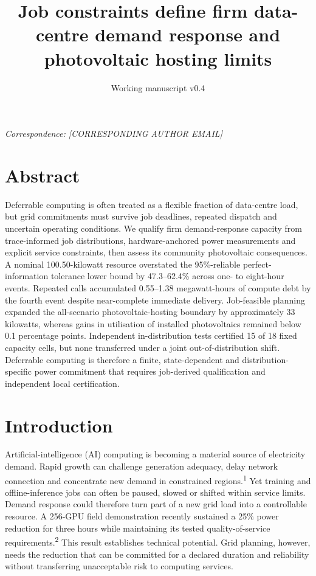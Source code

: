 \documentclass[10pt,a4paper]{article}
\title{\sffamily\bfseries Job constraints define firm data-centre demand response and photovoltaic hosting limits}
\author{\sffamily [AUTHOR NAMES AND AFFILIATIONS]}
\date{Working manuscript v0.4}
\begin{document}
\maketitle
\thispagestyle{fancy}

\emph{Correspondence: [CORRESPONDING AUTHOR EMAIL]}


\section*{Abstract}

Deferrable computing is often treated as a flexible fraction of data-centre load, but grid commitments must survive job deadlines, repeated dispatch and uncertain operating conditions. We qualify firm demand-response capacity from trace-informed job distributions, hardware-anchored power measurements and explicit service constraints, then assess its community photovoltaic consequences. A nominal 100.50-kilowatt resource overstated the 95\%-reliable perfect-information tolerance lower bound by 47.3–62.4\% across one- to eight-hour events. Repeated calls accumulated 0.55–1.38 megawatt-hours of compute debt by the fourth event despite near-complete immediate delivery. Job-feasible planning expanded the all-scenario photovoltaic-hosting boundary by approximately 33 kilowatts, whereas gains in utilisation of installed photovoltaics remained below 0.1 percentage points. Independent in-distribution tests certified 15 of 18 fixed capacity cells, but none transferred under a joint out-of-distribution shift. Deferrable computing is therefore a finite, state-dependent and distribution-specific power commitment that requires job-derived qualification and independent local certification.


\section*{Introduction}

Artificial-intelligence (AI) computing is becoming a material source of electricity demand. Rapid growth can challenge generation adequacy, delay network connection and concentrate new demand in constrained regions.\textsuperscript{1} Yet training and offline-inference jobs can often be paused, slowed or shifted within service limits. Demand response could therefore turn part of a new grid load into a controllable resource. A 256-GPU field demonstration recently sustained a 25\% power reduction for three hours while maintaining its tested quality-of-service requirements.\textsuperscript{2} This result establishes technical potential. Grid planning, however, needs the reduction that can be committed for a declared duration and reliability without transferring unacceptable risk to computing services.
\end{document}
